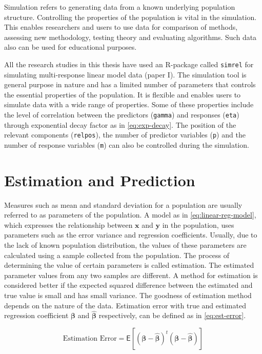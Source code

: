 \documentclass[11pt,twoside,openright,titlepage,
  headinclude,footinclude,BCOR=5mm,
  numbers=noenddot,cleardoublepage=empty,
  tablecaptionabove, dottedtoc,
  bibliography=totoc,paper=a4]{scrreprt}
\begin{document}
Simulation refers to generating data from a known underlying population structure. Controlling the properties of the population is vital in the simulation. This enables researchers and users to use data for comparison of methods, assessing new methodology, testing theory and evaluating algorithms. Such data also can be used for educational purposes.

All the research studies in this thesis have used an R-package called \texttt{simrel} for simulating multi-response linear model data (paper I). The simulation tool is general purpose in nature and has a limited number of parameters that controls the essential properties of the population. It is flexible and enables users to simulate data with a wide range of properties. Some of these properties include the level of correlation between the predictors (\texttt{gamma}) and responses (\texttt{eta}) through exponential decay factor as in \eqref{eq:exp-decay}. The position of the relevant components (\texttt{relpos}), the number of predictor variables (\texttt{p}) and the number of response variables (\texttt{m}) can also be controlled during the simulation.

\hypertarget{estimation-and-prediction}{%
\section{Estimation and Prediction}\label{estimation-and-prediction}}

Measures such as mean and standard deviation for a population are usually referred to as parameters of the population. A model as in \eqref{eq:linear-reg-model}, which expresses the relationship between \(\mathbf{x}\) and \(\mathbf{y}\) in the population, uses parameters such as the error variance and regression coefficients. Usually, due to the lack of known population distribution, the values of these parameters are calculated using a sample collected from the population. The process of determining the value of certain parameters is called estimation. The estimated parameter values from any two samples are different. A method for estimation is considered better if the expected squared difference between the estimated and true value is small and has small variance. The goodness of estimation method depends on the nature of the data. Estimation error with true and estimated regression coefficient \(\boldsymbol{\beta}\) and \(\boldsymbol{\widehat{\beta}}\) respectively, can be defined as in \eqref{eq:est-error}.

\begin{equation}
\text{Estimation Error} = \mathsf{E}\left[
  \left(\boldsymbol{\beta} - \hat{\boldsymbol{\beta}}\right)^t 
  \left(\boldsymbol{\beta} - \hat{\boldsymbol{\beta}}\right)
\right]
\label{eq:est-error}
\end{equation}
\end{document}
